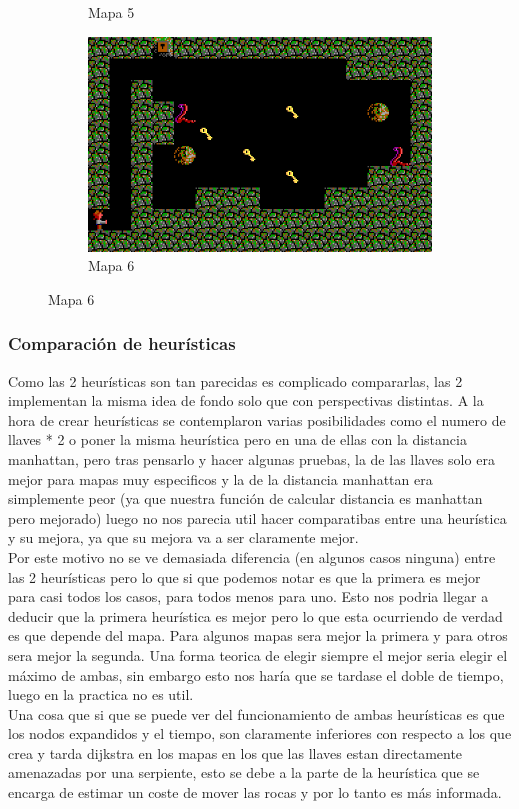\documentclass[11pt,spanish]{article}
\begin{document}
\begin{figure}[H]
\begin{subfigure}[b]{0.24\linewidth}
					\caption{Mapa 5}
				\end{subfigure}
				\begin{subfigure}[b]{0.39\linewidth}
					\includegraphics[width=\linewidth]{astar/lab6.png}
					\caption{Mapa 6}
				\end{subfigure}
			\end{figure}
			
		\subsubsection{Comparación de heurísticas}
			Como las 2 heurísticas son tan parecidas es complicado compararlas, las 2 implementan la misma idea de fondo solo que con perspectivas distintas. A la hora de crear heurísticas se contemplaron varias posibilidades como el numero de llaves * 2 o poner la misma heurística pero en una de ellas con la distancia manhattan, pero tras pensarlo y hacer algunas pruebas, la de las llaves solo era mejor para mapas muy especificos y la de la distancia manhattan era simplemente peor (ya que nuestra función de calcular distancia es manhattan pero mejorado) luego no nos parecia util hacer comparatibas entre una heurística y su mejora, ya que su mejora va a ser claramente mejor.\\
			Por este motivo no se ve demasiada diferencia (en algunos casos ninguna) entre las 2 heurísticas pero lo que si que podemos notar es que la primera es mejor para casi todos los casos, para todos menos para uno. Esto nos podria llegar a deducir que la primera heurística es mejor pero lo que esta ocurriendo de verdad es que depende del mapa. Para algunos mapas sera mejor la primera y para otros sera mejor la segunda. Una forma teorica de elegir siempre el mejor seria elegir el máximo de ambas, sin embargo esto nos haría que se tardase el doble de tiempo, luego en la practica no es util.\\
			Una cosa que si que se puede ver del funcionamiento de ambas heurísticas es que los nodos expandidos y el tiempo, son claramente inferiores con respecto a los que crea y tarda dijkstra en los mapas en los que las llaves estan directamente amenazadas por una serpiente, esto se debe a la parte de la heurística que se encarga de estimar un coste de mover las rocas y por lo tanto es más informada.
\end{document}
